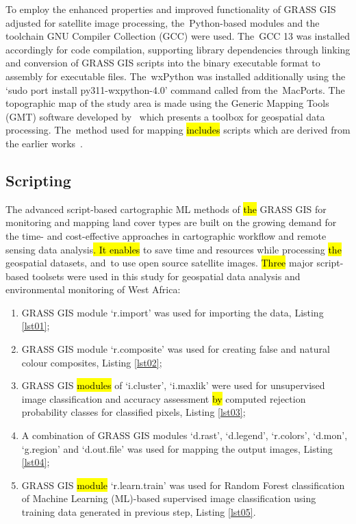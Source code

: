 \documentclass[coasts,article,accept,pdftex,oneauthor]{Definitions/mdpi}
\begin{document}
To employ the enhanced properties and improved functionality of GRASS GIS adjusted for satellite image processing, the~Python-based modules and the toolchain GNU Compiler Collection (GCC) {were used}. The~GCC 13 was installed accordingly for code compilation, supporting library dependencies through linking and conversion of GRASS GIS scripts into the binary executable format to assembly for executable files. The~wxPython was installed additionally using the `sudo port install py311-wxpython-4.0' {command called} from the~MacPorts. The topographic map of the study area is made using the Generic Mapping Tools (GMT) software developed by~\cite{Wessel} {which presents a toolbox for geospatial data processing}. The~method\hl{ }used for mapping \hl{includes} scripts {which }are derived from the earlier works~\cite{Lemenkova202217,Lemenkova202212,Lemenkova202203}. 

\subsection{Scripting}
The advanced script-based cartographic ML methods of \hl{the }GRASS GIS for monitoring and mapping land cover types are built on the growing demand for the time- and cost-effective approaches in cartographic workflow and remote sensing data analysis\hl{. It enables} to save time and resources while processing \hl{the }geospatial datasets, and~{to }use open source satellite images. \hl{Three} major script-based toolsets were used in this study for geospatial data analysis and environmental monitoring of West Africa:

 \begin{enumerate}
        \item GRASS GIS module `r.import' was used for importing the data, Listing \ref{lst01}; 
        \item GRASS GIS module `r.composite' was used for creating false and natural colour composites, Listing \ref{lst02}; 
        \item GRASS GIS \hl{modules} of `i.cluster', `i.maxlik'  were used for unsupervised image classification and accuracy assessment \hl{by} computed rejection probability classes for classified pixels, Listing \ref{lst03};  
         \item A combination of GRASS GIS modules `d.rast', `d.legend', `r.colors', `d.mon', `g.region' and `d.out.file' was used for mapping the output images, Listing \ref{lst04}; 
        \item GRASS GIS \hl{module} `r.learn.train' was used for Random Forest classification of Machine Learning (ML)-based supervised image classification using training data generated in previous step, Listing \ref{lst05}. 
  \end{enumerate}
  
\end{document}

